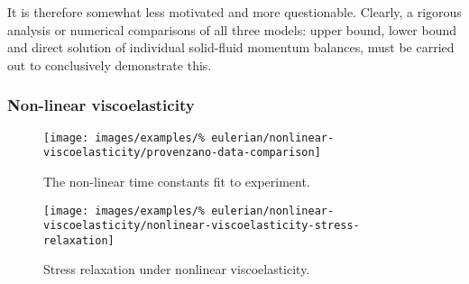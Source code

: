  It is therefore somewhat less motivated and more
questionable. Clearly, a rigorous analysis or numerical comparisons of
all three models: upper bound, lower bound and direct solution of
individual solid-fluid momentum balances, must be carried out to
conclusively demonstrate this.

\subsubsection{Non-linear viscoelasticity}
\label{non-linear-viscoelasticity}

\begin{figure}[!hptb]
\centering
\texttt{[image: images/examples/\%
eulerian/nonlinear-viscoelasticity/provenzano-data-comparison]}
\caption{The non-linear time constants fit to experiment.} 
\label{provenzano-data-fit}
\end{figure}

\begin{figure}[!hptb]
\centering
\texttt{[image: images/examples/\%
eulerian/nonlinear-viscoelasticity/nonlinear-viscoelasticity-stress-relaxation]}
\caption{Stress relaxation under nonlinear viscoelasticity.}
\label{nonlinear-viscoelasticity-stress-relaxation}
\end{figure}




%

